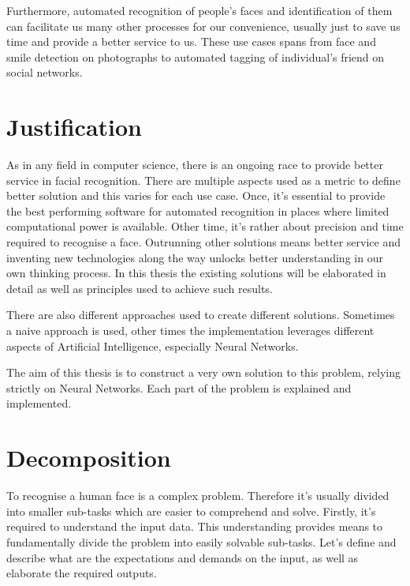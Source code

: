 Furthermore, automated recognition of people's faces and identification of them can facilitate us many other processes for our convenience, usually just to save us time and provide a better service to us. These use cases spans from face and smile detection on photographs to automated tagging of individual's friend on social networks.

\section{Justification}

As in any field in computer science, there is an ongoing race to provide better service in facial recognition. There are multiple aspects used as a metric to define better solution and this varies for each use case. Once, it's essential to provide the best performing software for automated recognition in places where limited computational power is available. Other time, it's rather about precision and time required to recognise a face. Outrunning other solutions means better service and inventing new technologies along the way unlocks better understanding in our own thinking process. In this thesis the existing solutions will be elaborated in detail as well as principles used to achieve such results.

There are also different approaches used to create different solutions. Sometimes a naive approach is used, other times the implementation leverages different aspects of Artificial Intelligence, especially Neural Networks.

The aim of this thesis is to construct a very own solution to this problem, relying strictly on Neural Networks. Each part of the problem is explained and implemented. %


\section{Decomposition}

To recognise a human face is a complex problem. Therefore it's usually divided into smaller sub-tasks which are easier to comprehend and solve. Firstly, it's required to understand the input data. This understanding provides means to fundamentally divide the problem into easily solvable sub-tasks. Let's define and describe what are the expectations and demands on the input, as well as elaborate the required outputs.

